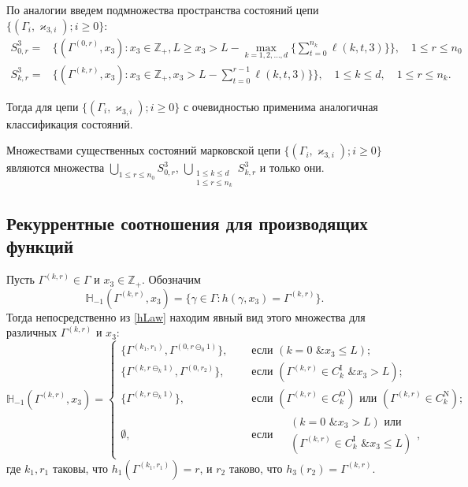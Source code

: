 \documentclass[a4paper,12pt,russian]{extarticle}
\newcommand{\MarkThree}{\{(\Gamma_i, \varkappa_{3,i}); i \geqslant 0\}}
\begin{document}
По аналогии введем подмножества пространства состояний цепи $\MarkThree$:
\begin{equation*}
\begin{aligned}
S^3_{0,r} = & \{(\Gamma^{(0,r)},x_3) \colon x_3\in {\mathbb Z}_+, L \geqslant x_3 > L - \max\limits_{k=1, 2, \ldots, d}\{\sum_{t=0}^{n_k} \ell(k,t,3)\}\}, \quad 1 \leqslant r \leqslant n_0 \\
S^3_{k,r} = & \{(\Gamma^{(k,r)},x_3) \colon x_3\in {\mathbb Z}_+, x_3 > L - \sum_{t=0}^{r-1} \ell(k,t,3)\} \}, \quad 1 \leqslant k \leqslant d, \quad 1 \leqslant r \leqslant n_k.
\end{aligned}
\end{equation*}

Тогда для цепи $\MarkThree$ с очевидностью применима аналогичная классификация состояний.
\begin{theorem}
Множествами существенных состояний марковской цепи $\MarkThree$ являются множества $\bigcup\limits_{1 \leqslant r \leqslant n_0}S^3_{0,r}$, $\bigcup\limits_{\substack{1 \leqslant k \leqslant d\\ 1 \leqslant r \leqslant n_k}} S^3_{k,r}$ и только они.
\end{theorem}

\subsection[Рекуррентные соотношения для производящих функций]%
{Рекуррентные соотношения для производящих функций}
Пусть $\Gamma^{(k,r)}\in \Gamma$ и $x_3 \in {\mathbb Z}_+$. Обозначим 
\begin{equation*}
{\mathbb H}_{-1}(\Gamma^{(k,r)}, x_3) = \{\gamma \in \Gamma \colon h(\gamma, x_3) = \Gamma^{(k,r)}\}.
\end{equation*}
Тогда непосредственно из \eqref{hLaw} находим явный вид этого множества для различных $\Gamma^{(k,r)}$ и $x_3$:
\begin{equation}
{\mathbb H}_{-1}(\Gamma^{(k,r)}, x_3) = 
\begin{cases}
\{\Gamma^{(k_1,r_1)}, \Gamma^{(0,r\ominus_0 1)}\},& \quad \text{ если } (k=0\text{ \& } x_3 \leqslant L);\\
\{\Gamma^{(k,r\ominus_k 1)}, \Gamma^{(0,r_2)}\},& \quad \text{ если } (\Gamma^{(k,r)}\in C_k^{\mathrm{I}} \text{ \& } x_3>L);\\ 
\{\Gamma^{(k,r\ominus_k 1)}\},& \quad \text{ если } (\Gamma^{(k,r)}\in C_k^{\mathrm{O}}) \text{ или } (\Gamma^{(k,r)}\in C_k^{\mathrm{N}});\\
\emptyset,& \quad \text{ если }
\begin{aligned} 
&(k = 0 \text{ \& } x_3>L) \text{ или } \\ & (\Gamma^{(k,r)}\in C_k^{\mathrm{I}} \text{ \& } x_3\leqslant L)
\end{aligned},
\end{cases}
\end{equation}
где $k_1,r_1$ таковы, что $h_1(\Gamma^{(k_1,r_1)})=r$, и $r_2$ таково, что $h_3(r_2)=\Gamma^{(k,r)}$.
\end{document}
